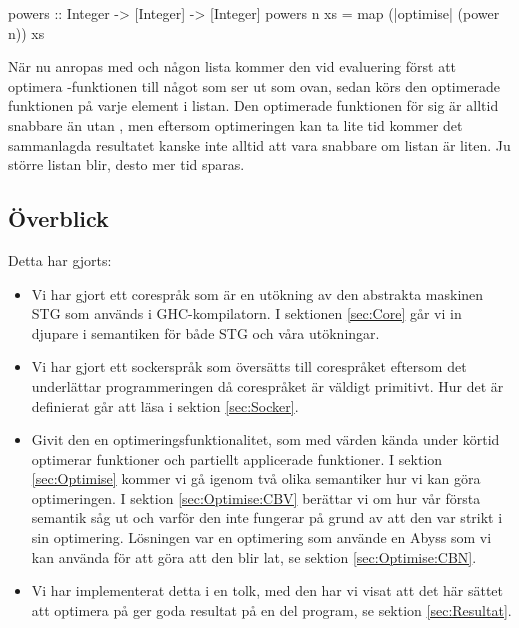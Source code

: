\documentclass[Rapport]{subfiles}
\begin{document}
\begin{codeEx}
powers :: Integer -> [Integer] -> [Integer]
powers n xs = map (|optimise| (power n)) xs
\end{codeEx}

När nu  anropas med  och någon lista  kommer
den vid evaluering först att optimera -funktionen till något som 
ser ut som  ovan, sedan körs den optimerade funktionen på varje
element i listan. Den optimerade funktionen för sig är alltid snabbare än utan , men eftersom
optimeringen kan ta lite tid kommer det sammanlagda resultatet kanske inte alltid att vara
snabbare om listan  är liten. 
Ju större listan  blir, desto mer tid sparas.



\subsection{Överblick}

Detta har gjorts:

\begin{itemize}
    \item Vi har gjort ett corespråk som är en utökning av den abstrakta maskinen STG \cite{stg} som används i 
          GHC-kompilatorn. I sektionen \ref{sec:Core} går vi in djupare i semantiken för både STG och våra utökningar. 
    \item Vi har gjort ett sockerspråk som översätts till corespråket eftersom det underlättar 
          programmeringen då corespråket är väldigt primitivt. Hur det är definierat
          går att läsa i sektion \ref{sec:Socker}.
    \item Givit den en optimeringsfunktionalitet, som med värden kända under körtid
          optimerar funktioner och partiellt applicerade funktioner. I sektion \ref{sec:Optimise}
          kommer vi gå igenom två olika semantiker hur vi kan göra optimeringen.
          I sektion \ref{sec:Optimise:CBV} berättar vi om hur vår första semantik
          såg ut och varför den inte fungerar på grund av att den var strikt i sin
          optimering. Lösningen var en optimering som använde en Abyss som vi kan
          använda för att göra att den blir lat, se sektion \ref{sec:Optimise:CBN}. 
    \item Vi har implementerat detta i en tolk, med den har vi visat att det här sättet 
            att optimera på ger goda resultat på en del program, se sektion \ref{sec:Resultat}.
\end{itemize}
\end{document}
